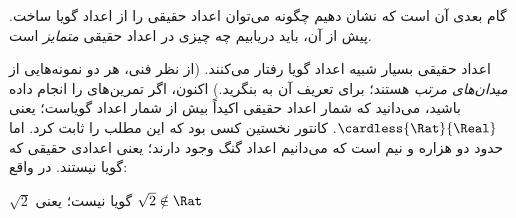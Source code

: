 \documentclass[../../../include/open-logic-section]{subfiles}
\begin{document}

گام بعدی آن است که نشان دهیم چگونه می‌توان اعداد حقیقی را از اعداد
گویا ساخت. پیش از آن، باید دریابیم چه چیزی در اعداد حقیقی
\emph{متمایز} است.

اعداد حقیقی بسیار شبیه اعداد گویا رفتار می‌کنند. (از نظر فنی، هر دو
نمونه‌هایی از \emph{میدان‌های مرتب} هستند؛ برای تعریف آن به
 بنگرید.) اکنون، اگر تمرین‌های
 را انجام داده باشید، می‌دانید که شمار اعداد حقیقی
اکیداً بیش از شمار اعداد گویاست؛ یعنی $\cardless{\Rat}{\Real}$. کانتور
نخستین کسی بود که این مطلب را ثابت کرد. اما حدود دو هزاره و نیم است که
می‌دانیم اعداد گنگ وجود دارند؛ یعنی اعدادی حقیقی که گویا نیستند. در واقع:
\begin{thm}
$\sqrt{2}$ گویا نیست؛ یعنی $\sqrt{2} \notin \Rat$
\end{thm}
\end{document}
